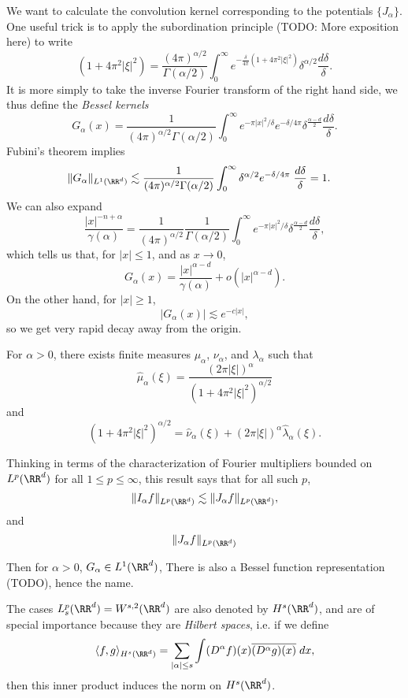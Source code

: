 We want to calculate the convolution kernel corresponding to the potentials $\{ J_\alpha \}$. One useful trick is to apply the subordination principle (TODO: More exposition here) to write
%
\[ (1 + 4 \pi^2 |\xi|^2) = \frac{(4\pi)^{\alpha/2}}{\Gamma(\alpha/2)} \int_0^\infty e^{-\frac{\delta}{4\pi}(1 + 4 \pi^2 |\xi|^2)} \delta^{\alpha / 2} \frac{d \delta}{\delta}. \]
%
It is more simply to take the inverse Fourier transform of the right hand side, we thus define the \emph{Bessel kernels}
%
\[ G_\alpha(x) = \frac{1}{(4 \pi)^{\alpha/2} \Gamma(\alpha/2)} \int_0^\infty e^{- \pi |x|^2 / \delta} e^{- \delta / 4\pi} \delta^{\frac{\alpha - d}{2}} \frac{d\delta}{\delta}. \]%
%
Fubini's theorem implies
%
\begin{align*}
    \| G_\alpha \|_{L^1(\RR^d)} &\lesssim \frac{1}{(4 \pi)^{\alpha/2} \Gamma(\alpha / 2)} \int_0^\infty \delta^{\alpha / 2} e^{- \delta / 4 \pi}\; \frac{d \delta}{\delta} = 1.
\end{align*}
%
We can also expand
%
\[ \frac{|x|^{-n + \alpha}}{\gamma(\alpha)} = \frac{1}{(4 \pi)^{\alpha / 2}} \frac{1}{\Gamma(\alpha/2)} \int_0^\infty e^{- \pi |x|^2/\delta} \delta^{\frac{\alpha - d}{2}} \frac{d\delta}{\delta}, \]
%
which tells us that, for $|x| \leq 1$, and as $x \to 0$,
%
\[ G_\alpha(x) = \frac{|x|^{\alpha - d}}{\gamma(\alpha)} + o(|x|^{\alpha - d}). \]
%
On the other hand, for $|x| \geq 1$,
%
\[ |G_\alpha(x)| \lesssim e^{- c |x|}, \]
%
so we get very rapid decay away from the origin.

\begin{lemma}
    For $\alpha > 0$, there exists finite measures $\mu_\alpha$, $\nu_\alpha$, and $\lambda_\alpha$ such that
    \[ \widehat{\mu}_\alpha(\xi) = \frac{(2 \pi |\xi|)^\alpha}{(1 + 4 \pi^2 |\xi|^2)^{\alpha/2}} \]
    and
    \[ (1 + 4 \pi^2 |\xi|^2)^{\alpha/2} = \widehat{\nu}_\alpha(\xi) + (2 \pi |\xi|)^\alpha \widehat{\lambda}_\alpha(\xi). \]
\end{lemma}

Thinking in terms of the characterization of Fourier multipliers bounded on $L^p(\RR^d)$ for all $1 \leq p \leq \infty$, this result says that for all such $p$,
%
\[ \| I_\alpha f \|_{L^p(\RR^d)} \lesssim \| J_\alpha f \|_{L^p(\RR^d)}, \]
%
and
%
\[ \| J_\alpha f \|_{L^p(\RR^d)} \]


Then for $\alpha > 0$, $G_\alpha \in L^1(\RR^d)$, There is also a Bessel function representation (TODO), hence the name.

The cases $L^p_s(\RR^d) = W^{s,2}(\RR^d)$ are also denoted by $H^s(\RR^d)$, and are of special importance because they are \emph{Hilbert spaces}, i.e. if we define
%
\[ \langle f, g \rangle_{H^s(\RR^d)} = \sum_{|\alpha| \leq s} \int (D^\alpha f)(x) \overline{(D^\alpha g)(x)}\; dx, \]
%
then this inner product induces the norm on $H^s(\RR^d)$.





